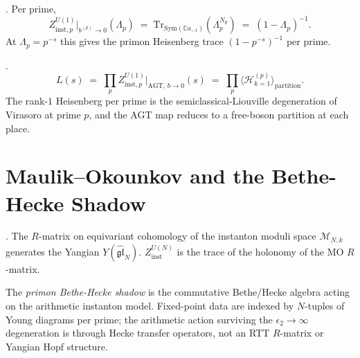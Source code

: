 \begin{corollary}
\label{v4-arith:cor:arithmetic-AGT}
\ClaimStatusConjectured. Per prime,
\begin{equation}
Z^{U(1)}_{\mathrm{inst},p}\bigr|_{b^{(p)}\to 0}(\Lambda_{p})
\;=\;\mathrm{Tr}_{\mathrm{Sym}(\mathbb{C}a_{-1})}(\Lambda_{p}^{N_{p}})
\;=\;(1-\Lambda_{p})^{-1}.
\end{equation}
At \(\Lambda_{p}=p^{-s}\) this gives the primon Heisenberg trace
\((1-p^{-s})^{-1}\) per prime.
\end{corollary}

\begin{theorem}[Hartnoll--Yang primon trace = \(b\to 0\) AGT]
\label{v4-arith:thm:HY-primon-as-bto0-AGT}
\ClaimStatusConjectured.
\begin{equation*}
L(s)\;=\;\prod_{p}Z^{U(1)}_{\mathrm{inst},p}\bigr|_{\mathrm{AGT,\,}b\to 0}(s)\;=\;\prod_{p}\langle\mathcal{H}^{(p)}_{k=1}\rangle_{\mathrm{partition}}.
\end{equation*}
The rank-\(1\) Heisenberg per prime is the semiclassical-Liouville
degeneration of Virasoro at prime \(p\), and the AGT map reduces to
a free-boson partition at each place.
\end{theorem}

\section{Maulik--Okounkov and the Bethe-Hecke Shadow}
\label{v4-arith:nk:maulik-okounkov}

\begin{theorem}
\label{v4-arith:thm:maulik-okounkov}
\ClaimStatusProvedElsewhere. The \(R\)-matrix on equivariant
cohomology of the instanton moduli space \(\mathcal{M}_{N,k}\)
generates the Yangian \(Y(\widehat{\mathfrak{gl}}_{N})\).
\(Z^{U(N)}_{\mathrm{inst}}\) is the trace of the holonomy of the MO
\(R\)-matrix.
\end{theorem}

\begin{definition}
\label{v4-arith:def:primon-yangian}
The \emph{primon Bethe-Hecke shadow} is the commutative
Bethe/Hecke algebra acting on the arithmetic instanton model.
Fixed-point data are indexed by \(N\)-tuples of Young diagrams per
prime; the arithmetic action surviving the \(\epsilon_{2}\to\infty\)
degeneration is through Hecke transfer operators, not an RTT
\(R\)-matrix or Yangian Hopf structure.
\end{definition}

